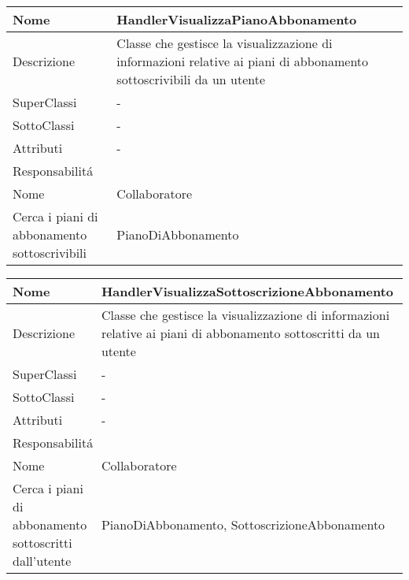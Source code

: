 \begin{center}
    \begin{longtable}{ |p{3cm}|p{3cm}|p{3cm}|p{3cm}| }
        \hline
        Nome & \multicolumn{3}{|p{9cm}|}{HandlerVisualizzaPianoAbbonamento} \\\hline
        Descrizione & \multicolumn{3}{|p{9cm}|}{Classe che gestisce la visualizzazione  di informazioni relative ai piani di abbonamento sottoscrivibili da un utente} \\\hline
        SuperClassi & \multicolumn{3}{|p{9cm}|}{-} \\\hline
        SottoClassi & \multicolumn{3}{|p{9cm}|}{-} \\\hline
        Attributi & \multicolumn{3}{|p{9cm}|}{-} \\\hline
        \multicolumn{4}{|p{12cm}|}{Responsabilit\'a} \\\hline
        \multicolumn{2}{|p{6cm}|}{Nome} & \multicolumn{2}{|p{6cm}|}{Collaboratore} \\\hline
        \multicolumn{2}{|p{6cm}|}{Cerca i piani di abbonamento sottoscrivibili} & \multicolumn{2}{|p{6cm}|}{PianoDiAbbonamento} \\\hline
    \end{longtable}
\end{center}

\begin{center}
    \begin{longtable}{ |p{3cm}|p{3cm}|p{3cm}|p{3cm}| }
        \hline
        Nome & \multicolumn{3}{|p{9cm}|}{HandlerVisualizzaSottoscrizioneAbbonamento} \\\hline
        Descrizione & \multicolumn{3}{|p{9cm}|}{Classe che gestisce la visualizzazione  di informazioni relative ai piani di abbonamento sottoscritti da un utente} \\\hline
        SuperClassi & \multicolumn{3}{|p{9cm}|}{-} \\\hline
        SottoClassi & \multicolumn{3}{|p{9cm}|}{-} \\\hline
        Attributi & \multicolumn{3}{|p{9cm}|}{-} \\\hline
        \multicolumn{4}{|p{12cm}|}{Responsabilit\'a} \\\hline
        \multicolumn{2}{|p{6cm}|}{Nome} & \multicolumn{2}{|p{6cm}|}{Collaboratore} \\\hline
        \multicolumn{2}{|p{6cm}|}{Cerca i piani di abbonamento sottoscritti dall'utente} & \multicolumn{2}{|p{6cm}|}{PianoDiAbbonamento, SottoscrizioneAbbonamento} \\\hline
    \end{longtable}
\end{center}

